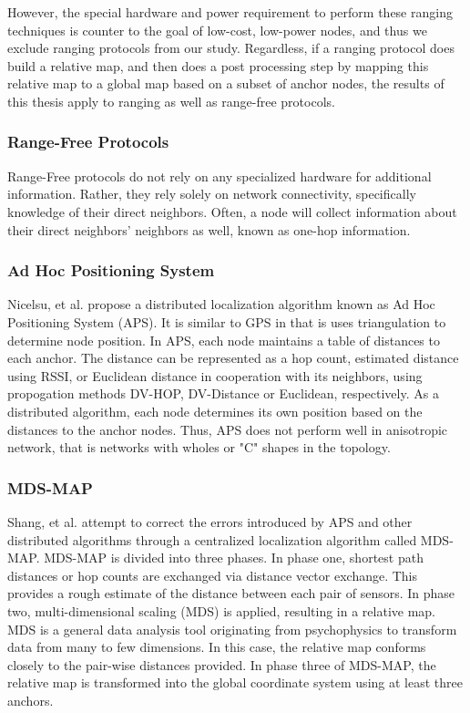 However, the special hardware and power requirement to perform these ranging techniques is counter to the goal of low-cost, low-power nodes, and thus we exclude ranging protocols from our study.  Regardless, if a ranging protocol does build a relative map, and then does a post processing step by mapping this relative map to a global map based on a subset of anchor nodes, the results of this thesis apply to ranging as well as range-free protocols.

\subsubsection{Range-Free Protocols}
Range-Free protocols do not rely on any specialized hardware for additional information.  Rather, they rely solely on network connectivity, specifically knowledge of their direct neighbors.  Often, a node will collect information about their direct neighbors' neighbors as well, known as one-hop information.  

\subsubsection{Ad Hoc Positioning System}
\cite{APS}
Nicelsu, et al. propose a distributed localization algorithm known as Ad Hoc Positioning System (APS).  It is similar to GPS in that is uses triangulation to determine node position.  In APS, each node maintains a table of distances to each anchor.  The distance can be represented as a hop count, estimated distance using RSSI, or Euclidean distance in cooperation with its neighbors, using propogation methods DV-HOP, DV-Distance or Euclidean, respectively.  As a distributed algorithm, each node determines its own position based on the distances to the anchor nodes.  Thus, APS does not perform well in anisotropic network, that is networks with wholes or "C" shapes in the topology.  

\subsubsection{MDS-MAP}
\cite{MDS-MAP}
Shang, et al. attempt to correct the errors introduced by APS and other distributed algorithms through a centralized localization algorithm called MDS-MAP.  MDS-MAP is divided into three phases.  In phase one, shortest path distances or hop counts are exchanged via distance vector exchange.  This provides a rough estimate of the distance between each pair of sensors.  In phase two, multi-dimensional scaling (MDS) is applied, resulting in a relative map.  MDS is a general data analysis tool originating from psychophysics to transform data from many to few dimensions.  In this case, the relative map conforms closely to the pair-wise distances provided.  In phase three of MDS-MAP, the relative map is transformed into the global coordinate system using at least three anchors.  

